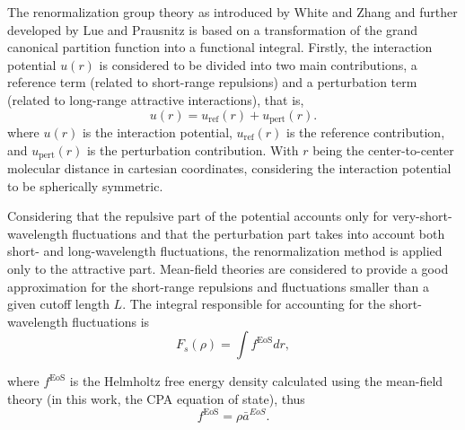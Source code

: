 \documentclass[preprint,12pt,3p]{elsarticle}
\begin{document}
The renormalization group theory as introduced by White and Zhang \cite{white1993renormalization} and further developed by Lue and Prausnitz \cite{lue1998renormalization, lue1998brenormalization} is based on a transformation of the grand canonical partition function into a functional integral.
Firstly, the interaction potential $u(r)$ is considered to be divided into two main contributions, a reference term (related to short-range repulsions) and a perturbation term (related to long-range attractive interactions), that is,
\begin{equation} \label{eq:u(r)}
u(r) = u_\text{ref}(r) + u_\text{pert}(r).
\end{equation}
where $u(r)$ is the interaction potential, $u_\text{ref}(r)$ is the reference contribution, and $u_\text{pert}(r)$ is the perturbation contribution. With $r$ being the center-to-center molecular distance in cartesian coordinates, considering the interaction potential to be spherically symmetric.

Considering that the repulsive part of the potential accounts only for very-short-wavelength fluctuations and that the perturbation part takes into account both short- and long-wavelength fluctuations, the renormalization method is applied only to the attractive part.
Mean-field theories are considered to provide a good approximation for the short-range repulsions and fluctuations smaller than a given cutoff length $L$.
The integral responsible for accounting for the short-wavelength fluctuations is
\begin{equation} \label{eq:Fs}
F_{s}(\rho) = \int f^\text{EoS} dr,
\end{equation}

where $f^\text{EoS}$ is the Helmholtz free energy density calculated using the mean-field theory (in this work, the CPA equation of state), thus
\begin{equation} \label{eq:f_to_a}
f^\text{EoS} = \rho \bar{a}^{EoS}.
\end{equation}
\end{document}
